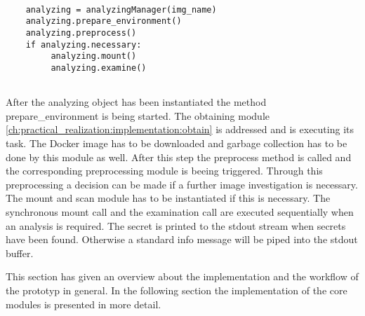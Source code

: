 \lstset{language=Python} 
\begin{lstlisting}[]
	
    analyzing = analyzingManager(img_name)
    analyzing.prepare_environment()
    analyzing.preprocess()
    if analyzing.necessary:
         analyzing.mount()
         analyzing.examine()
    
\end{lstlisting}
After the analyzing object has been instantiated the method prepare\_environment is being started. 
The obtaining module \ref{ch:practical_realization:implementation:obtain} is addressed and is executing its task.
The Docker image has to be downloaded and garbage collection has to be done by this module as well. 
After this step the preprocess method is called and the corresponding preprocessing module is beeing triggered.
Through this preprocessing a decision can be made if a further image investigation is necessary. 
The mount and scan module has to be instantiated if this is necessary.
The synchronous mount call and the examination call are executed sequentially when an analysis is required.
The secret is printed to the stdout stream when secrets have been found. 
Otherwise a standard info message will be piped into the stdout buffer.

This section has given an overview about the implementation and the workflow of the prototyp in general.
In the following section the implementation of the core modules is presented in more detail.

